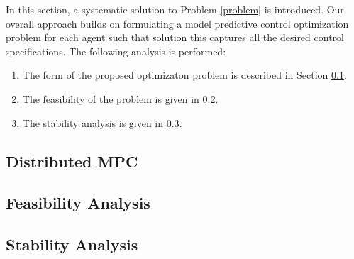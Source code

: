 In this section, a systematic solution to Problem \ref{problem} is introduced.
Our overall approach builds on formulating a model predictive control
optimization problem for each agent such that solution this captures all
the desired control specifications. The following analysis is performed:

\begin{enumerate}
	\item The form of the proposed optimizaton problem is described in Section \ref{sec:distributed_mpc}.
	\item The feasibility of the problem is given in \ref{sec:feasibility_analysis}.
	\item The stability analysis is given in \ref{sec:stability_analysis}.
\end{enumerate}

\subsection{Distributed MPC} \label{sec:distributed_mpc}
  


\subsection{Feasibility Analysis} \label{sec:feasibility_analysis}

\subsection{Stability Analysis} \label{sec:stability_analysis}
